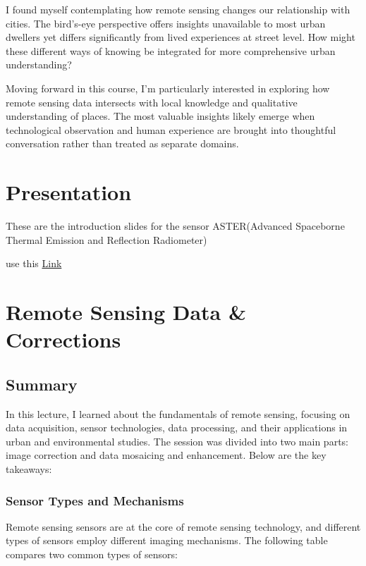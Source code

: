 \documentclass[
  letterpaper,
  DIV=11,
  numbers=noendperiod]{scrreprt}
\begin{document}
I found myself contemplating how remote sensing changes our relationship
with cities. The bird's-eye perspective offers insights unavailable to
most urban dwellers yet differs significantly from lived experiences at
street level. How might these different ways of knowing be integrated
for more comprehensive urban understanding?

Moving forward in this course, I'm particularly interested in exploring
how remote sensing data intersects with local knowledge and qualitative
understanding of places. The most valuable insights likely emerge when
technological observation and human experience are brought into
thoughtful conversation rather than treated as separate domains.


\chapter{Presentation}\label{presentation}

These are the introduction slides for the sensor ASTER(Advanced
Spaceborne Thermal Emission and Reflection Radiometer)

use this
\href{https://lydia0930.github.io/CASA0023xaringan/w2-slides.html}{Link}


\chapter{Remote Sensing Data \&
Corrections}\label{remote-sensing-data-corrections}

\section{Summary}\label{summary-1}

In this lecture, I learned about the fundamentals of remote sensing,
focusing on data acquisition, sensor technologies, data processing, and
their applications in urban and environmental studies. The session was
divided into two main parts: image correction and data mosaicing and
enhancement. Below are the key takeaways:

\subsection{Sensor Types and
Mechanisms}\label{sensor-types-and-mechanisms}

Remote sensing sensors are at the core of remote sensing technology, and
different types of sensors employ different imaging mechanisms. The
following table compares two common types of sensors:
\end{document}
